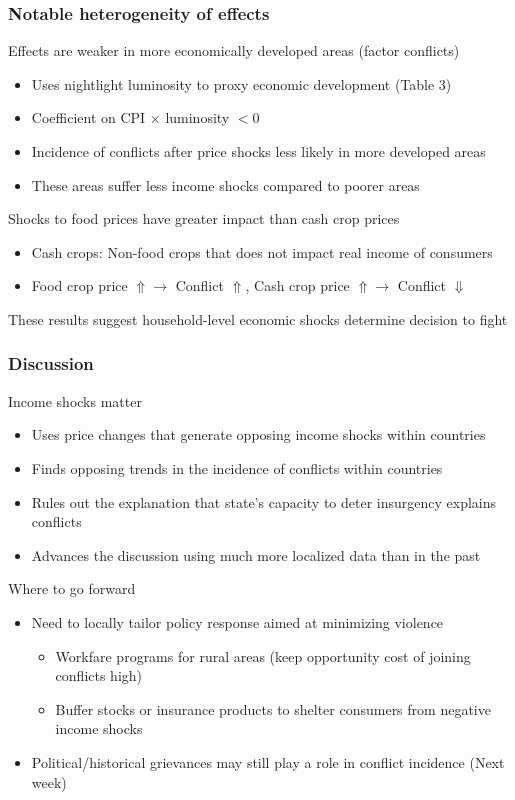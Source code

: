\documentclass[aspectratio=169]{beamer}
\begin{document}
\begin{frame}
\frametitle{Notable heterogeneity of effects}
Effects are weaker in more economically developed areas (factor conflicts)
\begin{itemize}\setlength\itemsep{3pt}
  \item Uses nightlight luminosity to proxy economic development (Table 3)
  \item Coefficient on CPI $\times$ luminosity $<0$
  \item Incidence of conflicts after price shocks less likely in more developed areas
  \item These areas suffer less income shocks compared to poorer areas
\end{itemize} \medskip
Shocks to food prices have greater impact than cash crop prices
\begin{itemize}\setlength\itemsep{3pt}
  \item Cash crops: Non-food crops that does not impact real income of consumers
  \item Food crop price $\Uparrow\to$  Conflict $\Uparrow$, Cash crop price $\Uparrow\to$  Conflict $\Downarrow$ 
\end{itemize} \medskip
These results suggest household-level economic shocks determine decision to fight
\end{frame}

\begin{frame}
\frametitle{Discussion}
Income shocks matter
\begin{itemize}\setlength\itemsep{3pt}
  \item Uses price changes that generate opposing income shocks within countries 
  \item Finds opposing trends in the incidence of conflicts within countries
  \item Rules out the explanation that state's capacity to deter insurgency explains conflicts
  \item Advances the discussion using much more localized data than in the past
\end{itemize} \medskip
Where to go forward
\begin{itemize}\setlength\itemsep{3pt}
  \item Need to locally tailor policy response aimed at minimizing violence
  \begin{itemize}\setlength\itemsep{3pt}
    \item Workfare programs for rural areas (keep opportunity cost of joining conflicts high)
    \item Buffer stocks or insurance products to shelter consumers from negative income shocks
    \end{itemize} 
  \item Political/historical grievances may still play a role in conflict incidence (Next week)
  
\end{itemize} \medskip
\end{frame}
\end{document}
